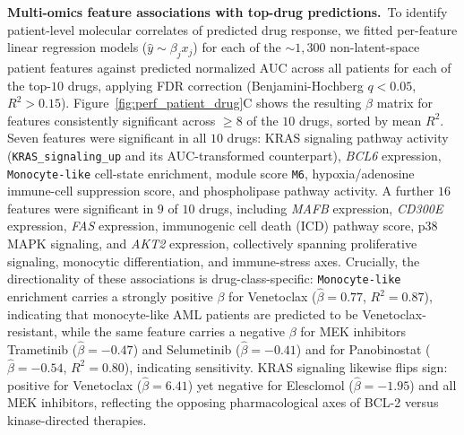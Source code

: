 \documentclass[pdflatex,sn-mathphys-num]{sn-jnl}
\theoremstyle{thmstyleone}
\theoremstyle{thmstyletwo}
\theoremstyle{thmstylethree}
\begin{document}
\noindent\textbf{Multi-omics feature associations with top-drug predictions.}~To identify patient-level molecular correlates of predicted drug response, we fitted per-feature linear regression models ($\hat{y} \sim \beta_j x_j$) for each of the $\sim\!1{,}300$ non-latent-space patient features against predicted normalized AUC across all patients for each of the top-$10$ drugs, applying FDR correction (Benjamini-Hochberg $q < 0.05$, $R^2 > 0.15$). Figure~\ref{fig:perf_patient_drug}C shows the resulting $\beta$ matrix for features consistently significant across $\geq\!8$ of the $10$ drugs, sorted by mean $R^2$. Seven features were significant in all $10$ drugs: KRAS signaling pathway activity (\texttt{KRAS\_signaling\_up} and its AUC-transformed counterpart), \textit{BCL6} expression, \texttt{Monocyte-like} cell-state enrichment, module score \texttt{M6}, hypoxia/adenosine immune-cell suppression score, and phospholipase pathway activity. A further $16$ features were significant in $9$ of $10$ drugs, including \textit{MAFB} expression, \textit{CD300E} expression, \textit{FAS} expression, immunogenic cell death (ICD) pathway score, p38 MAPK signaling, and \textit{AKT2} expression, collectively spanning proliferative signaling, monocytic differentiation, and immune-stress axes. Crucially, the directionality of these associations is drug-class-specific: \texttt{Monocyte-like} enrichment carries a strongly positive $\beta$ for Venetoclax ($\hat{\beta} = 0.77$, $R^2 = 0.87$), indicating that monocyte-like AML patients are predicted to be Venetoclax-resistant, while the same feature carries a negative $\beta$ for MEK inhibitors Trametinib ($\hat{\beta} = -0.47$) and Selumetinib ($\hat{\beta} = -0.41$) and for Panobinostat ($\hat{\beta} = -0.54$, $R^2 = 0.80$), indicating sensitivity. KRAS signaling likewise flips sign: positive for Venetoclax ($\hat{\beta} = 6.41$) yet negative for Elesclomol ($\hat{\beta} = -1.95$) and all MEK inhibitors, reflecting the opposing pharmacological axes of BCL-2 versus kinase-directed therapies.
\end{document}
